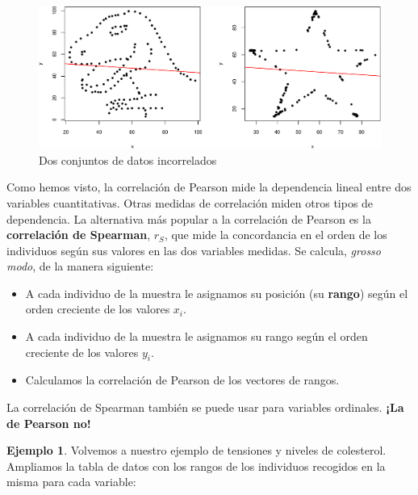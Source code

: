 \documentclass[
]{book}
\theoremstyle{definition}
\theoremstyle{definition}
\newtheorem{example}{Ejemplo}[chapter]
\theoremstyle{definition}
\theoremstyle{definition}
\theoremstyle{remark}
\begin{document}
\begin{figure}

{\centering \includegraphics[width=0.9\linewidth]{INREMDN_files/figure-latex/datasaurus-1} 

}

\caption{Dos conjuntos de datos incorrelados}\label{fig:datasaurus}
\end{figure}

Como hemos visto, la correlación de Pearson mide la dependencia lineal entre dos variables cuantitativas. Otras medidas de correlación miden otros tipos de dependencia. La alternativa más popular a la correlación de Pearson es la \textbf{correlación de Spearman}, \(r_S\), que mide la concordancia en el orden de los individuos según sus valores en las dos variables medidas. Se calcula, \emph{grosso modo}, de la manera siguiente:

\begin{itemize}
\item
  A cada individuo de la muestra le asignamos su posición (su \textbf{rango}) según el orden creciente de los valores \(x_i\).
\item
  A cada individuo de la muestra le asignamos su rango según el orden creciente de los valores \(y_i\).
\item
  Calculamos la correlación de Pearson de los vectores de rangos.
\end{itemize}

\begin{rmdimportant}
La correlación de Spearman también se puede usar para variables ordinales. \textbf{¡La de Pearson no!}
\end{rmdimportant}

\begin{example}
\protect\hypertarget{exm:unnamed-chunk-318}{}\label{exm:unnamed-chunk-318}Volvemos a nuestro ejemplo de tensiones y niveles de colesterol. Ampliamos la tabla de datos con los rangos de los individuos recogidos en la misma para cada variable:
\end{example}
\end{document}
